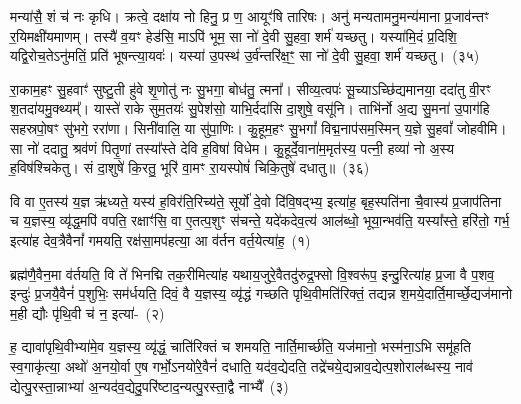 मन्या॑सै॒ शं च॑ नः कृधि। क्रत्वे॒ दक्षा॑य नो हिनु॒ प्र ण॒ आयूꣳ॑षि तारिषः। अनु॑ मन्यतामनु॒मन्य॑माना प्र॒जाव॑न्तꣳ र॒यिमक्षी॑यमाणम्। तस्यै॑ व॒यꣳ हेड॑सि॒ माऽपि॑ भूम॒ सा नो॑ दे॒वी सु॒हवा॒ शर्म॑ यच्छतु। यस्या॑मि॒दं प्र॒दिशि॒ यद्वि॒रोच॒ते\-ऽनु॑मतिं॒ प्रति॑ भूषन्त्या॒यवः॑। यस्या॑ उ॒पस्थ॑ उ॒र्व॑न्तरि॑क्ष॒ꣳ॒ सा नो॑ दे॒वी सु॒हवा॒ शर्म॑ यच्छतु।~(३५)

रा॒काम॒हꣳ सु॒हवाꣳ॑ सुष्टु॒ती हु॑वे शृ॒णोतु॑ नः सु॒भगा॒ बोध॑तु॒ त्मना᳚। सीव्य॒त्वपः॑ सू॒च्या\-ऽच्छि॑द्यमानया॒ ददा॑तु वी॒रꣳ श॒तदा॑यमु॒क्थ्यम्᳚। यास्ते॑ राके सुम॒तयः॑ सु॒पेश॑सो॒ याभि॒र्ददा॑सि दा॒शुषे॒ वसू॑नि। ताभि॑र्नो अ॒द्य सु॒मना॑ उ॒पाग॑हि सहस्रपो॒षꣳ सु॑भगे॒ ररा॑णा। सिनी॑वालि॒ या सु॑पा॒णिः। कु॒हूम॒हꣳ सु॒भगां᳚ विद्म॒नाप॑सम॒स्मिन् य॒ज्ञे सु॒हवां᳚ जोहवीमि। सा नो॑ ददातु॒ श्रव॑णं पितृ॒णां तस्या᳚स्ते देवि ह॒विषा॑ विधेम। कु॒हूर्दे॒वाना॑म॒मृत॑स्य॒ पत्नी॒ हव्या॑ नो अ॒स्य ह॒विष॑श्चिकेतु। सं दा॒शुषे॑ कि॒रतु॒ भूरि॑ वा॒मꣳ रा॒यस्पोषं॑ चिकि॒तुषे॑ दधातु॥~(३६)

{\anuvakamend[{भामा॑सो॒ दाता॒ त्वम॒न्तरि॑क्ष॒ꣳ॒ सा नो॑ दे॒वी सु॒हवा॒ शर्म॑ यच्छतु॒ श्रव॑णं॒ चतु॑र्विꣳशतिश्च}]}%

{}

\setcounter{anuvakam}{0}
वि वा ए॒तस्य॑ य॒ज्ञ ऋ॑ध्यते॒ यस्य॑ ह॒विर॑ति॒रिच्य॑ते॒ सूर्यो॑ दे॒वो दि॑वि॒षद्भ्य॒ इत्या॑ह॒ बृह॒स्पति॑ना चै॒वास्य॑ प्र॒जा\-प॑तिना च य॒ज्ञस्य॒ व्यृ॑द्ध॒मपि॑ वपति॒ रक्षाꣳ॑सि॒ वा ए॒तत्प॒शुꣳ स॑चन्ते॒ यदे॑कदेव॒त्य॑ आल॑ब्धो॒ भूया॒न्भव॑ति॒ यस्या᳚स्ते॒ हरि॑तो॒ गर्भ॒ इत्या॑ह देव॒त्रैवैनां᳚ गमयति॒ रक्ष॑सा॒मप॑हत्या॒ आ व॑र्तन वर्त॒येत्या॑ह॒~(१)

ब्रह्म॑णै॒वैन॒मा व॑र्तयति॒ वि ते॑ भिनद्मि तक॒रीमित्या॑ह यथाय॒जुरे॒वैतदु॑रुद्र॒फ्सो वि॒श्वरू॑प॒ इन्दु॒रित्या॑ह प्र॒जा वै प॒शव॒ इन्दुः॑ प्र॒जयै॒वैनं॑ प॒शुभिः॒ सम॑र्धयति॒ दिवं॒ वै य॒ज्ञस्य॒ व्यृ॑द्धं गच्छति पृथि॒वीमति॑रिक्तं॒ तद्यन्न श॒मये॒दार्ति॒मार्च्छे॒द्यज॑मानो म॒ही द्यौः पृ॑थि॒वी च॑ न॒ इत्या॑-~(२)

ह॒ द्यावा॑पृथि॒वीभ्या॑मे॒व य॒ज्ञस्य॒ व्यृ॑द्धं॒ चाति॑रिक्तं च शमयति॒ नार्ति॒मार्च्छ॑ति॒ यज॑मानो॒ भस्म॑ना॒ऽभि समू॑हति स्व॒गाकृ॑त्या॒ अथो॑ अ॒नयो॒र्वा ए॒ष गर्भो॒\-ऽनयो॑रे॒वैनं॑ दधाति॒ यद॑व॒द्येदति॒ तद्रे॑चये॒द्यन्नाव॒द्येत्प॒शोराल॑ब्धस्य॒ नाव॑ द्येत्पु॒रस्ता॒न्नाभ्या॑ अ॒न्यद॑व॒द्येदु॒परि॑ष्टाद॒न्यत्पु॒रस्ता॒द्वै नाभ्यै᳚~(३)

